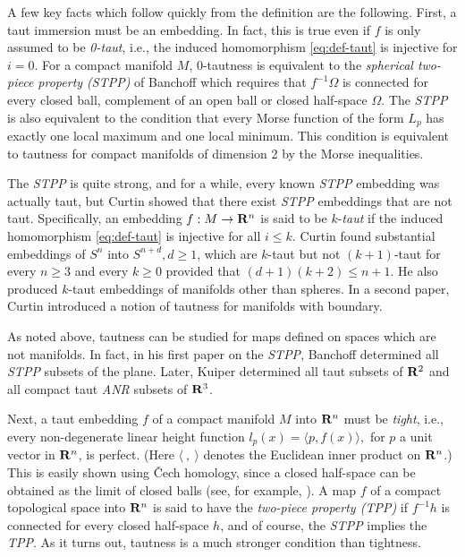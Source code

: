 \documentclass[12pt]{article}
\begin{document}
A few key facts which follow quickly from the definition are
the following.  First, a taut immersion must be an embedding.
In fact, this is true even if $f$ is only assumed to be 
{\em 0-taut}, i.e., the induced homomorphism \eqref{eq:def-taut} is injective
for $i=0$.  For a compact manifold $M$, 0-tautness is
equivalent to the {\em spherical two-piece property (STPP)}
of Banchoff \cite{Ban1} which requires that $f^{-1}\Omega$ is connected
for every closed ball, complement of an open ball or closed
half-space $\Omega$.  The {\em STPP} is also equivalent 
to the condition that every
Morse function of the form $L_p$ has exactly one local
maximum and one local minimum. This condition is equivalent to tautness
for compact manifolds of dimension 2 by the Morse inequalities.  

The {\em STPP} is quite strong,
and for a while, every known {\em STPP} embedding was actually
taut, but Curtin \cite{Cur} showed that there exist {\em STPP} 
embeddings that are not taut.  Specifically,
an embedding $f:M \rightarrow {\bf R}^n$
is said to be $k$-{\em taut} if the induced homomorphism \eqref{eq:def-taut}
is injective  for all $i \leq k$.  Curtin found substantial
embeddings of $S^n$ into $S^{n+d}, d \geq 1$, which are $k$-taut
but not $(k+1)$-taut for every $n \geq 3$ and every
$k \geq 0$ provided that $(d+1)(k+2)\leq n+1$.  He also produced
$k$-taut embeddings of manifolds other than spheres.  In a second
paper, Curtin \cite{Cur1} introduced a notion of tautness
for manifolds with boundary. 

As noted above, tautness can be studied for maps defined on spaces
which are not manifolds.  In fact, in his first paper on the {\em STPP},
Banchoff \cite{Ban1} determined all {\em STPP} subsets of the plane.
Later,
Kuiper \cite{Ku2} determined all taut subsets of ${\bf R}^2$
and all compact taut {\em ANR} subsets of ${\bf R}^3$. 

Next, a taut embedding $f$ of a compact manifold $M$ into
${\bf R}^n$ must be {\em tight}, i.e., every non-degenerate
linear height function $l_p(x) = \langle p,f(x) \rangle,$ for $p$
a unit vector in ${\bf R}^n$, is perfect.  (Here $\langle \ ,\ \rangle$ denotes the Euclidean inner product on ${\bf R}^n$.)
This is easily
shown using \v{C}ech homology, since a closed half-space can
be obtained as the limit of closed balls (see, for example, \cite[pp. 53--55]{CR8}). 
A map $f$ of a
compact topological space into ${\bf R}^n$ is said to have
the {\em two-piece property (TPP)} if $f^{-1}h$ is connected
for every closed half-space $h$, and of course, the {\em STPP} implies
the {\em TPP}. 
As it turns out,
tautness is a much stronger condition than tightness.
\end{document}
